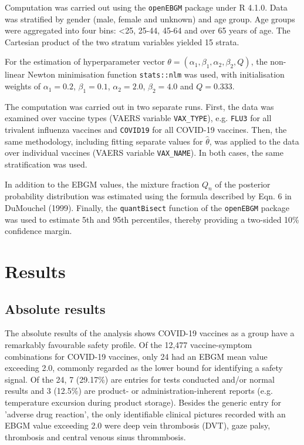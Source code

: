 \documentclass[12pt]{article}
\begin{document}
Computation was carried out using the \texttt{openEBGM}\cite{canida2017openebgm} package under R 4.1.0.\cite{rstats} Data was stratified by gender (male, female and unknown) and age group. Age groups were aggregated into four bins: <25, 25-44, 45-64 and over 65 years of age. The Cartesian product of the two stratum variables yielded 15 strata.

For the estimation of hyperparameter vector $\theta = (\alpha_1, \beta_1, \alpha_2, \beta_2, Q)$, the non-linear Newton minimisation function \texttt{stats::nlm} was used, with initialisation weights of $\alpha_1 = 0.2$, $\beta_1 = 0.1$, $\alpha_2 = 2.0$, $\beta_2 = 4.0$ and $Q = 0.333$. 

The computation was carried out in two separate runs. First, the data was examined over vaccine types (VAERS variable \texttt{VAX\_TYPE}), e.g. \texttt{FLU3} for all trivalent influenza vaccines and \texttt{COVID19} for all COVID-19 vaccines. Then, the same methodology, including fitting separate values for $\hat{\theta}$, was applied to the data over individual vaccines (VAERS variable \texttt{VAX\_NAME}). In both cases, the same stratification was used.

In addition to the EBGM values, the mixture fraction $Q_n$ of the posterior probability distribution was estimated using the formula described by Eqn. 6 in DuMouchel (1999).\cite{dumouchel1999bayesian} Finally, the \texttt{quantBisect} function of the \texttt{openEBGM} package was used to estimate 5th and 95th percentiles, thereby providing a two-sided 10\% confidence margin. 


\section{Results} %
\label{sec:results}

\subsection{Absolute results} %
\label{sub:absolute_results}

The absolute results of the analysis shows COVID-19 vaccines as a group have a remarkably favourable safety profile. Of the 12,477 vaccine-symptom combinations for COVID-19 vaccines, only 24 had an EBGM mean value exceeding 2.0, commonly regarded as the lower bound for identifying a safety signal. Of the 24, 7 (29.17\%) are entries for tests conducted and/or normal results and 3 (12.5\%) are product- or administration-inherent reports (e.g. temperature excursion during product storage). Besides the generic entry for 'adverse drug reaction', the only identifiable clinical pictures recorded with an EBGM value exceeding 2.0 were deep vein thrombosis (DVT), gaze palsy, thrombosis and central venous sinus thrommbosis.
\end{document}
